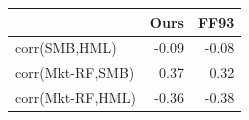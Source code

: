 \begin{tabular}{lrr}
\toprule
 & Ours & FF93 \\
\midrule
corr(SMB,HML) & -0.09 & -0.08 \\
corr(Mkt-RF,SMB) & 0.37 & 0.32 \\
corr(Mkt-RF,HML) & -0.36 & -0.38 \\
\bottomrule
\end{tabular}
